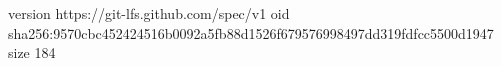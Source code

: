 version https://git-lfs.github.com/spec/v1
oid sha256:9570cbc452424516b0092a5fb88d1526f679576998497dd319fdfcc5500d1947
size 184
